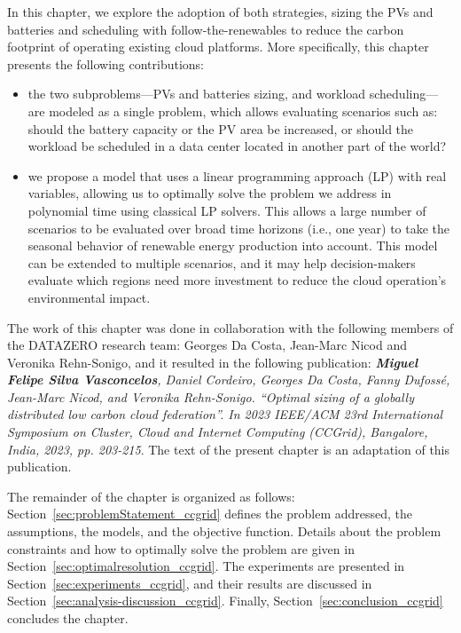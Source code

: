 In this chapter, we explore the adoption of both strategies, sizing the PVs and batteries and scheduling with follow-the-renewables to reduce the carbon footprint of operating existing cloud platforms. More specifically, this chapter presents the following contributions:


\begin{itemize}
    
    \item the two subproblems---PVs and batteries sizing, and workload scheduling---are modeled as a single problem, which allows evaluating scenarios such as: should the battery capacity or the PV area be increased, or should the workload be scheduled in a data center located in another part of the world?
    
    \item we propose a model that uses a linear programming approach (LP) with real variables, allowing us to optimally solve the problem we address in polynomial time using classical LP solvers. This allows a large number of scenarios to be evaluated over broad time horizons (i.e., one year) to take the seasonal behavior of renewable energy production into account. This model can be extended to multiple scenarios, and it may help decision-makers evaluate which regions need more investment to reduce the cloud operation's environmental impact.

\end{itemize}



The work of this chapter was done in collaboration with the following members of the DATAZERO\cite{datazero} research team: Georges Da Costa, Jean-Marc Nicod and Veronika Rehn-Sonigo, and it resulted in the following publication:  \textit{\textbf{Miguel Felipe Silva Vasconcelos}, Daniel Cordeiro, Georges Da Costa, Fanny Dufossé, Jean-Marc Nicod, and Veronika Rehn-Sonigo. ``Optimal sizing of a globally distributed low carbon cloud federation''. In 2023 IEEE/ACM 23rd International Symposium on Cluster, Cloud and Internet Computing (CCGrid), Bangalore, India, 2023, pp. 203-215}. The text of the present chapter is an adaptation of this publication.


The remainder of the chapter is organized as follows: Section~\ref{sec:problemStatement_ccgrid} defines the problem addressed, the assumptions, the models, and the objective function. Details about the problem constraints and how to optimally solve the problem are given in Section~\ref{sec:optimalresolution_ccgrid}. The experiments are presented in Section~\ref{sec:experiments_ccgrid}, and their results are discussed in Section~\ref{sec:analysis-discussion_ccgrid}. Finally, Section~\ref{sec:conclusion_ccgrid} concludes the chapter. 



